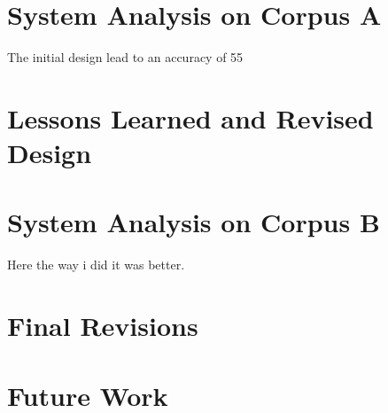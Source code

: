 \documentclass[11pt,letterpaper]{article}
\begin{document}
\section{System Analysis on Corpus A}
The initial design lead to an accuracy of 55%

\section{Lessons Learned and Revised Design}

\section{System Analysis on Corpus B}
Here the way i did it was better. 

\section{Final Revisions}

\section{Future Work}







\label{lastpage}
\end{document}
